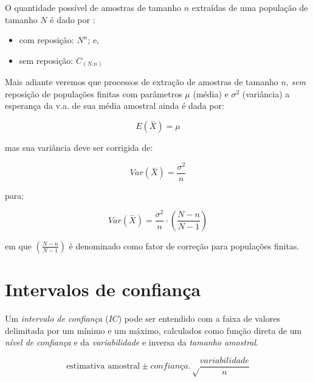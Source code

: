 \documentclass[
]{book}
\providecommand{\tightlist}{%
  \setlength{\itemsep}{0pt}\setlength{\parskip}{0pt}}
\begin{document}
\hfill\break

O quantidade possível de amostras de tamanho \(n\) extraídas de uma população de tamanho \(N\) é dado por :

\hfill\break

\begin{itemize}
\tightlist
\item
  com reposição: \(N^{n}\); e,
\item
  sem reposição: \(C_{(N.n)}\)
\end{itemize}

\hfill\break

Mais adiante veremos que processos de extração de amostras de tamanho \(n\), \emph{sem} reposição de populações finitas com parâmetros \(\mu\) (média) e \(\sigma^{2}\) (variância) a esperança da v.a. de sua média amostral ainda é dada por:

\hfill\break

\[
E(\stackrel{-}{X})=\mu
\]

\hfill\break

mas sua variância deve ser corrigida de:

\hfill\break

\[
Var(\stackrel{-}{X})  =\frac{\sigma^{2}}{n} 
\]

\hfill\break

para:

\hfill\break

\[
Var(\stackrel{-}{X}) =\frac{\sigma^{2}}{n} \cdot (\frac{N-n}{N-1})
\]

\hfill\break

em que \((\frac{N-n}{N-1})\) é denominado como fator de correção para populações finitas.

\hfill\break

\hypertarget{intervalos-de-confianuxe7a-1}{%
\section{Intervalos de confiança}\label{intervalos-de-confianuxe7a-1}}

\hfill\break

Um \emph{intervalo de confiança} (\(IC\)) pode ser entendido com a faixa de valores delimitada por um mínimo e um máximo, calculados como função direta de um \emph{nível de confiança} e da \emph{variabilidade} e inversa da \emph{tamanho amostral}.

\hfill\break

\[
\text{estimativa amostral} \pm confiança.\sqrt\frac{variabilidade}{n}
\]
\end{document}
